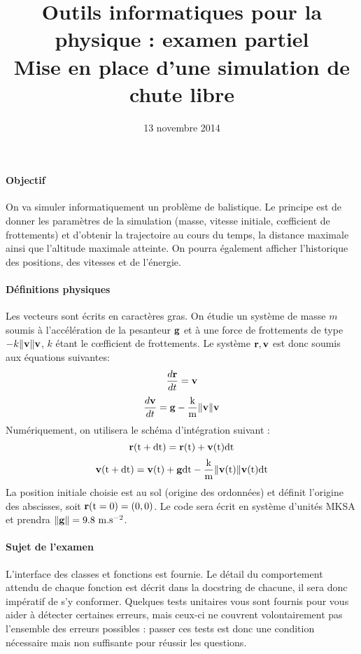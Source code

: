 \documentclass[11pt]{article}
\title{Outils informatiques pour la physique : examen partiel\\
  Mise en place d'une simulation de chute libre}
\date{13 novembre 2014}
\begin{document}
\maketitle

\paragraph{Objectif} On va simuler informatiquement un problème de balistique. Le principe est de donner les paramètres de la simulation (masse, vitesse initiale, c\oe fficient de frottements) et d'obtenir la trajectoire au cours du temps, la distance maximale ainsi que l'altitude maximale atteinte. On pourra également afficher l'historique des positions, des vitesses et de l'énergie.

\paragraph{Définitions physiques} Les vecteurs sont écrits en caractères gras. On étudie un système de masse $m$ soumis à l'accélération de la pesanteur $\bf{g}$ et à une force de frottements de type $-k  \| \bf{v} \| \bf{v}$, $k$ étant le c\oe fficient de frottements.
Le système $\bf{r}, \bf{v}$ est donc soumis aux équations suivantes:
\begin{equation}
  \frac{d \bf{r}}{dt} = \bf{v}
\end{equation}
\begin{equation}
  \frac{d \bf{v}}{dt} = \bf{g} - \rm \frac{k}{m} \| \bf{v} \| \bf{v}
\end{equation}
Numériquement, on utilisera le schéma d'intégration suivant :
\begin{equation}
  \bf{r} \rm (t+dt) = \bf{r} \rm (t) + \bf{v} \rm (t) dt
\end{equation}
\begin{equation}
  \bf{v} \rm (t+dt) = \bf{v} \rm (t) + \bf{g} \rm dt - \frac{k}{m} \| \bf{v} \rm (t) \| \bf{v} \rm (t) dt
\end{equation}
La position initiale choisie est au sol (origine des ordonnées) et définit l'origine des abscisses, soit $\bf r \rm (t = 0) = (0, 0)$. Le code sera écrit en système d'unités MKSA et prendra $\| \bf g \rm \| = 9.8 ~ m.s^{-2}$.

\paragraph{Sujet de l'examen} L'interface des classes et fonctions est fournie. Le détail du comportement attendu de chaque fonction est décrit dans la docstring de chacune, il sera donc impératif de s'y conformer. Quelques tests unitaires vous sont fournis pour vous aider à détecter certaines erreurs, mais ceux-ci ne couvrent volontairement pas l'ensemble des erreurs possibles : passer ces tests est donc une condition nécessaire mais non suffisante pour réussir les questions.
\end{document}
